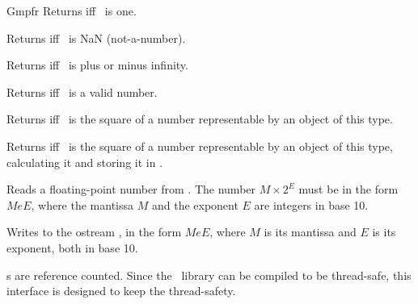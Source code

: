 \begin{ccRefClass} {Gmpfr}
        {Returns  iff \ccVar~is one.}

        {Returns  iff \ccVar~is NaN (not-a-number).}

        {Returns  iff \ccVar~is plus or minus infinity.}

        {Returns  iff \ccVar~is a valid number.}

        {Returns  iff \ccVar~is the square of a number
        representable by an object of this type.}

        {Returns  iff \ccVar~is the square of a number
        representable by an object of this type, calculating it and storing
        it in .}



        {Reads a floating-point number from . The number
        \(M \times 2^E\) must be in the form \(MeE\), where the mantissa
        \(M\) and the exponent \(E\) are integers in base 10.}

        {Writes  to the ostream , in the form
        \(MeE\), where \(M\) is its mantissa and \(E\) is its exponent,
        both in base 10.}


\ccImplementation
{}s are reference counted. Since the \mpfr\ library can be compiled
to be thread-safe, this interface is designed to keep the thread-safety.

\ccSeeAlso
{}\\

\end{ccRefClass}
